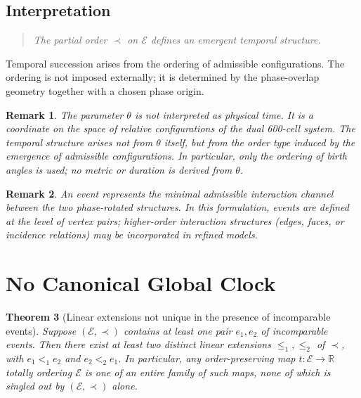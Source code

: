 \documentclass[12pt]{article}
\newtheorem{theorem}{Theorem}
\newtheorem{remark}[theorem]{Remark}
\newcommand{\Ecal}{\mathcal{E}}
\begin{document}
\subsection{Interpretation}

\begin{quote}
\textit{The partial order $\prec$ on $\Ecal$ defines an emergent temporal structure.}
\end{quote}

Temporal succession arises from the ordering of admissible configurations. The ordering is not imposed externally; it is determined by the phase-overlap geometry together with a chosen phase origin.

\begin{remark}
The parameter $\theta$ is not interpreted as physical time. It is a coordinate on the space of relative configurations of the dual 600-cell system. The temporal structure arises not from $\theta$ itself, but from the order type induced by the emergence of admissible configurations. In particular, only the ordering of birth angles is used; no metric or duration is derived from $\theta$.
\end{remark}

\begin{remark}
An event represents the minimal admissible interaction channel between the two phase-rotated structures. In this formulation, events are defined at the level of vertex pairs; higher-order interaction structures (edges, faces, or incidence relations) may be incorporated in refined models.
\end{remark}

\section{No Canonical Global Clock}\label{sec:noclock}

\begin{theorem}[Linear extensions not unique in the presence of incomparable events]\label{thm:noclock}
Suppose $(\Ecal, \prec)$ contains at least one pair $e_1, e_2$ of incomparable events. Then there exist at least two distinct linear extensions $\leq_1, \leq_2$ of $\prec$, with $e_1 <_1 e_2$ and $e_2 <_2 e_1$. In particular, any order-preserving map $t : \Ecal \to \mathbb{R}$ totally ordering $\Ecal$ is one of an entire family of such maps, none of which is singled out by $(\Ecal, \prec)$ alone.
\end{theorem}
\end{document}
